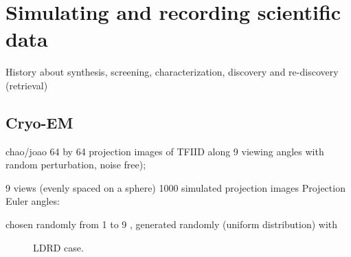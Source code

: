 \section{Simulating and recording scientific data}\label{sec:mat}
History about synthesis, screening, characterization, discovery and re-discovery (retrieval)



\subsection{Cryo-EM}\label{subsec:cryo}
chao/joao
64 by 64 projection images of TFIID along 9 viewing angles with random perturbation, noise free);




9 views (evenly spaced on a sphere)
1000 simulated projection images
Projection Euler angles:

 chosen randomly from 1 to 9
,  generated randomly (uniform distribution) with

\begin{figure}[!t]
\centering
{}
\hfil
{}
\caption{LDRD case.}
\label{fig:ldrd}
\end{figure}

